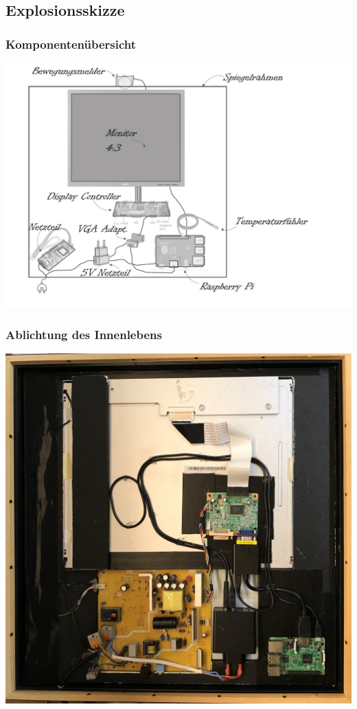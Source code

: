 \documentclass[11pt]{beamer}
\begin{document}
	\subsection{Explosionsskizze}
	\begin{frame}
		\frametitle{Komponenten\"ubersicht}
		\includegraphics[scale = 0.4]{images/smartMirrorExplosionsskizze.pdf}
	\end{frame}
	\begin{frame}
		\frametitle{Ablichtung des Innenlebens}
		\begin{center}
			\includegraphics[scale= 0.07]{images/20170624_114852514_iOS.jpg}		
		\end{center}
	\end{frame}
\end{document}
